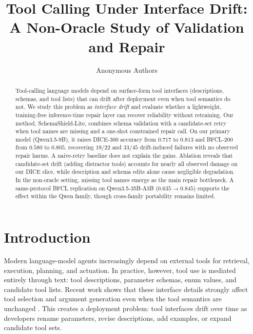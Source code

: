 \documentclass{svproc}
\newcommand{\method}{SchemaShield-Lite\xspace}
\begin{document}
\raggedbottom
\mainmatter

\title{Tool Calling Under Interface Drift: A Non-Oracle Study of Validation and Repair}

\author{Anonymous Authors}

\maketitle

\begin{abstract}
Tool-calling language models depend on surface-form tool
interfaces (descriptions, schemas, and tool lists) that can drift
after deployment even when tool semantics do not. We study this problem as
\emph{interface drift} and evaluate whether a lightweight, training-free
inference-time repair layer can recover reliability without retraining.
Our method, \method, combines schema validation with a candidate-set retry
when tool names are missing and a one-shot constrained repair call. On our primary
model (Qwen3.5-9B), it raises DICE-300 accuracy from $0.717$ to $0.813$ and
BFCL-200 from $0.580$ to $0.805$, recovering $19/22$ and $33/45$ drift-induced
failures with no observed repair harms. A naive-retry baseline does not explain
the gains. Ablation reveals that candidate-set drift (adding distractor
tools) accounts for nearly all observed damage on our DICE slice, while
description and schema edits alone cause negligible degradation. In the
non-oracle setting, missing tool names emerge as the main repair bottleneck.
A same-protocol BFCL replication on Qwen3.5-35B-A3B ($0.635 \rightarrow 0.845$)
supports the effect within the Qwen family, though cross-family portability
remains limited.
\end{abstract}

\section{Introduction}
Modern language-model agents increasingly depend on external tools for retrieval,
execution, planning, and actuation. In practice, however, tool use is mediated
entirely through text: tool descriptions, parameter schemas, enum values, and
candidate tool lists. Recent work shows that these interface details strongly affect
tool selection and argument generation
even when the tool semantics are unchanged \cite{guo2026rewrite,faghih2025gaming}.
This creates a deployment problem: tool interfaces drift over time as developers
rename parameters, revise descriptions, add examples, or expand candidate tool sets.
\end{document}
